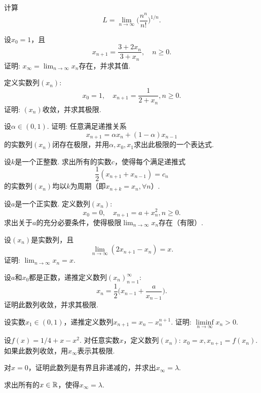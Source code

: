 \begin{example}
  计算
  \[ L=\lim_{n\to\infty}\Big(\frac{n^n}{n!}\Big)^{1/n}. \]
\end{example}

\begin{example}
  设$x_0=1$，且
  \[ x_{n+1} = \frac{3+2x_n}{3+x_n},\quad n\ge0. \]
  证明: $x_\infty=\lim_{n\to\infty}x_n$存在，并求其值.
\end{example}

\begin{example}
  定义实数列$(x_n)$:
  \[ x_0=1,\quad x_{n+1}=\frac1{2+x_n},n\ge0. \]
  证明: $(x_n)$收敛，并求其极限.
\end{example}

\begin{example}
  设$\alpha\in(0,1)$. 证明: 任意满足递推关系
  \[ x_{n+1}=\alpha x_n+(1-\alpha)x_{n-1} \]
  的实数列$(x_n)$闭存在极限，并用$\alpha,x_0,x_1$求出此极限的一个表达式.
\end{example}

\begin{example}
  设$k$是一个正整数. 求出所有的实数$c$，使得每个满足递推式
  \[ \frac12(x_{n+1}+x_{n-1}) = c_n \]
  的实数列$(x_n)$均以$k$为周期（即$x_{n+k}=x_n,\forall n$）.
\end{example}

\begin{example}
  设$a$是一个正实数. 定义数列$(x_n)$:
  \[ x_0=0,\quad x_{n+1}=a+x_n^2,n\ge0. \]
  求出关于$a$的充分必要条件，使得极限$\lim_{n\to\infty}x_n$存在（有限）.
\end{example}

\begin{example}
  设$(x_n)$是实数列，且
  \[ \lim_{n\to\infty}(2x_{n+1}-x_n)=x. \]
  证明: $\lim_{n\to\infty}x_n=x$.
\end{example}

\begin{example}
  设$a$和$x_0$都是正数，递推定义数列$(x_n)_{n=1}^\infty$:
  \[ x_n=\frac12\Big( x_{n-1}+\frac a{x_{n-1}} \Big). \]
  证明此数列收敛，并求其极限.
\end{example}

\begin{example}
  设实数$x_1\in(0,1)$，递推定义数列$x_{n+1}=x_n-x_n^{n+1}$. 证明: $\liminf\limits_{n\to\infty}x_n>0$.
\end{example}

\begin{example}
  设$f(x)=1/4+x-x^2$. 对任意实数$x$，定义数列$(x_n)$: $x_0=x,x_{n+1}=f(x_n)$. 如果此数列收敛，用$x_\infty$表示其极限.
  \begin{eenum}
    \item 对$x=0$，证明此数列是有界且非递减的，并求出$x_\infty=\lambda$.
    \item 求出所有的$x\in\mathbb R$，使得$x_\infty=\lambda$.
  \end{eenum}
\end{example}

